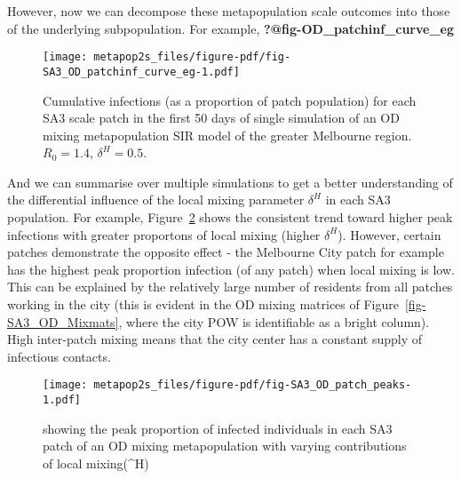 \documentclass[
  letterpaper,
  DIV=11,
  numbers=noendperiod]{scrartcl}
\begin{document}
However, now we can decompose these metapopulation scale outcomes into
those of the underlying subpopulation. For example,
\textbf{?@fig-OD\_patchinf\_curve\_eg}

\begin{figure}

{\centering \texttt{[image: metapop2s\_files/figure-pdf/fig-SA3\_OD\_patchinf\_curve\_eg-1.pdf]}

}

\caption{\label{fig-SA3_OD_patchinf_curve_eg}Cumulative infections (as a
proportion of patch population) for each SA3 scale patch in the first 50
days of single simulation of an OD mixing metapopulation SIR model of
the greater Melbourne region. \(R_0 = 1.4\), \(\delta^H = 0.5\).}

\end{figure}

And we can summarise over multiple simulations to get a better
understanding of the differential influence of the local mixing
parameter \(\delta ^H\) in each SA3 population. For example,
Figure~\ref{fig-SA3_OD_patch_peaks} shows the consistent trend toward
higher peak infections with greater proportons of local mixing (higher
\(\delta^H\)). However, certain patches demonstrate the opposite effect
- the Melbourne City patch for example has the highest peak proportion
infection (of any patch) when local mixing is low. This can be explained
by the relatively large number of residents from all patches working in
the city (this is evident in the OD mixing matrices of
Figure~\ref{fig-SA3_OD_Mixmats}, where the city POW is identifiable as a
bright column). High inter-patch mixing means that the city center has a
constant supply of infectious contacts.

\begin{figure}

{\centering \texttt{[image: metapop2s\_files/figure-pdf/fig-SA3\_OD\_patch\_peaks-1.pdf]}

}

\caption{\label{fig-SA3_OD_patch_peaks}showing the peak proportion of
infected individuals in each SA3 patch of an OD mixing metapopulation
with varying contributions of local mixing(\delta\^{}H)}

\end{figure}
\end{document}
